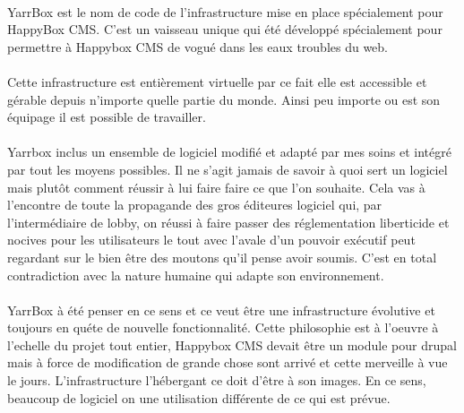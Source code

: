\documentclass[11pt, a4paper ]{article}
\begin{document}
\begin{spacing}{1.5}
\paragraph{}
YarrBox est le nom de code de l'infrastructure mise en place spécialement pour HappyBox CMS. C'est un vaisseau unique qui été  développé spécialement pour permettre à Happybox CMS de vogué dans les eaux troubles du web. 
\paragraph{}
Cette infrastructure est entièrement virtuelle par ce fait elle est accessible et gérable depuis n'importe quelle partie du monde. Ainsi peu importe ou est son équipage il est possible de travailler. 
\paragraph{}
Yarrbox inclus un ensemble de logiciel modifié et adapté par mes soins et intégré par tout les moyens possibles. Il ne s'agit jamais de savoir à quoi sert un logiciel mais plutôt comment réussir à lui faire faire ce que l'on souhaite. Cela vas à l'encontre de toute la propagande des gros éditeures logiciel qui, par l'intermédiaire de lobby, on réussi à faire passer des réglementation liberticide et nocives pour les utilisateurs le tout avec l'avale d'un pouvoir exécutif peut regardant sur le bien être des moutons qu'il pense avoir soumis. C'est en total contradiction avec la nature humaine qui adapte son environnement. 
\paragraph{}
YarrBox à été penser en ce sens et ce veut être une infrastructure évolutive et toujours en quéte de nouvelle fonctionnalité. Cette philosophie est à l'oeuvre à l'echelle du projet tout entier, Happybox CMS devait être un module pour drupal mais à force de modification de grande chose sont arrivé et cette merveille à vue le jours. L'infrastructure l'hébergant ce doit d'être à son images. En ce sens, beaucoup de logiciel on une utilisation différente de ce qui est prévue.

\end{spacing}
\end{document}
